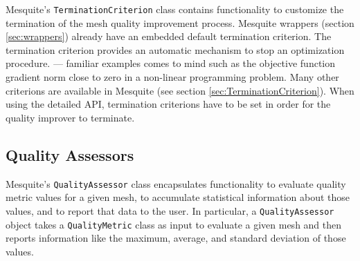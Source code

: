Mesquite's \texttt{TerminationCriterion} class contains functionality
to customize the termination of the mesh quality improvement process. 
Mesquite wrappers (section \ref{sec:wrappers}) already have an embedded default termination
criterion. The termination criterion provides an automatic mechanism to stop an optimization
procedure. --- familiar examples  comes to mind such as the objective function gradient norm close
to zero in a non-linear programming problem. Many other criterions are available in Mesquite (see
section \ref{sec:TerminationCriterion}). When using the detailed API, termination criterions have to
be set in order for the quality improver to terminate. 
 

\subsection{Quality Assessors}

Mesquite's \texttt{QualityAssessor} class encapsulates functionality to
evaluate quality metric values for a given mesh, to accumulate
statistical information about those values, and to report that data to
the user.  In particular, a \texttt{QualityAssessor} object takes a
{\tt QualityMetric} class as input to evaluate a given mesh and then
reports information like the maximum, average, and standard deviation
of those values.


